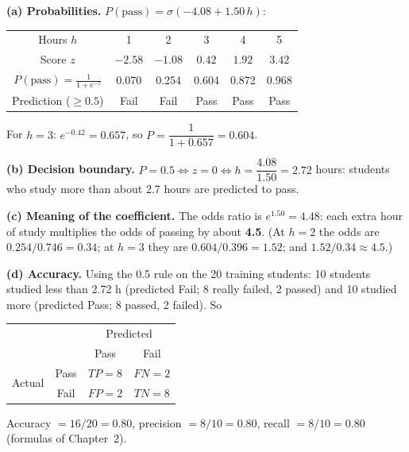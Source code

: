\begin{example}
\textbf{(a) Probabilities.} $P(\text{pass})=\sigma(-4.08+1.50\,h)$:
\begin{center}
\begin{tabular}{@{}c|ccccc@{}}
\toprule
Hours $h$ & 1 & 2 & 3 & 4 & 5\\
Score $z$ & $-2.58$ & $-1.08$ & $0.42$ & $1.92$ & $3.42$\\
$P(\text{pass})=\frac{1}{1+e^{-z}}$ & 0.070 & 0.254 & 0.604 & 0.872 & 0.968\\
Prediction ($\ge0.5$) & Fail & Fail & Pass & Pass & Pass\\
\bottomrule
\end{tabular}
\end{center}
For $h=3$: $e^{-0.42}=0.657$, so $P=\dfrac{1}{1+0.657}=0.604$.\par
\textbf{(b) Decision boundary.} $P=0.5\iff z=0\iff h=\dfrac{4.08}{1.50}=\mathbf{2.72}$ hours: students who study more than about 2.7 hours are predicted to pass.\par
\textbf{(c) Meaning of the coefficient.} The odds ratio is $e^{1.50}=4.48$: each extra hour of study multiplies the odds of passing by about \textbf{4.5}. (At $h=2$ the odds are $0.254/0.746=0.34$; at $h=3$ they are $0.604/0.396=1.52$; and $1.52/0.34\approx4.5$.)\par
\textbf{(d) Accuracy.} Using the 0.5 rule on the 20 training students: 10 students studied less than 2.72 h (predicted Fail; 8 really failed, 2 passed) and 10 studied more (predicted Pass; 8 passed, 2 failed). So
\begin{center}
\begin{tabular}{@{}cc|cc@{}}
\toprule
 & & \multicolumn{2}{c}{Predicted}\\
 & & Pass & Fail\\
\midrule
\multirow{2}{*}{Actual} & Pass & $TP=8$ & $FN=2$\\
 & Fail & $FP=2$ & $TN=8$\\
\bottomrule
\end{tabular}
\end{center}
Accuracy $=16/20=0.80$, precision $=8/10=0.80$, recall $=8/10=0.80$ (formulas of Chapter~2).
\end{example}

